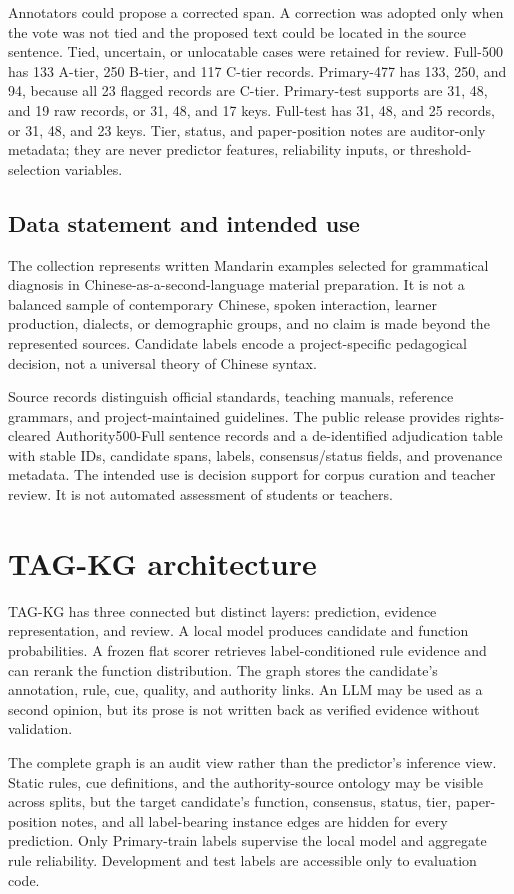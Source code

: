 \documentclass{CUP-JNL-NLP}
\begin{document}
Annotators could propose a corrected span. A correction was adopted only when the vote was not tied and the proposed text could be located in the source sentence. Tied, uncertain, or unlocatable cases were retained for review. Full-500 has 133 A-tier, 250 B-tier, and 117 C-tier records. Primary-477 has 133, 250, and 94, because all 23 flagged records are C-tier. Primary-test supports are 31, 48, and 19 raw records, or 31, 48, and 17 keys. Full-test has 31, 48, and 25 records, or 31, 48, and 23 keys. Tier, status, and paper-position notes are auditor-only metadata; they are never predictor features, reliability inputs, or threshold-selection variables.

\subsection{Data statement and intended use}
The collection represents written Mandarin examples selected for grammatical diagnosis in Chinese-as-a-second-language material preparation. It is not a balanced sample of contemporary Chinese, spoken interaction, learner production, dialects, or demographic groups, and no claim is made beyond the represented sources. Candidate labels encode a project-specific pedagogical decision, not a universal theory of Chinese syntax.

Source records distinguish official standards, teaching manuals, reference grammars, and project-maintained guidelines. The public release provides rights-cleared Authority500-Full sentence records and a de-identified adjudication table with stable IDs, candidate spans, labels, consensus/status fields, and provenance metadata. The intended use is decision support for corpus curation and teacher review. It is not automated assessment of students or teachers.

\section{TAG-KG architecture}
TAG-KG has three connected but distinct layers: prediction, evidence representation, and review. A local model produces candidate and function probabilities. A frozen flat scorer retrieves label-conditioned rule evidence and can rerank the function distribution. The graph stores the candidate's annotation, rule, cue, quality, and authority links. An LLM may be used as a second opinion, but its prose is not written back as verified evidence without validation.

The complete graph is an audit view rather than the predictor's inference view. Static rules, cue definitions, and the authority-source ontology may be visible across splits, but the target candidate's function, consensus, status, tier, paper-position notes, and all label-bearing instance edges are hidden for every prediction. Only Primary-train labels supervise the local model and aggregate rule reliability. Development and test labels are accessible only to evaluation code.
\end{document}
